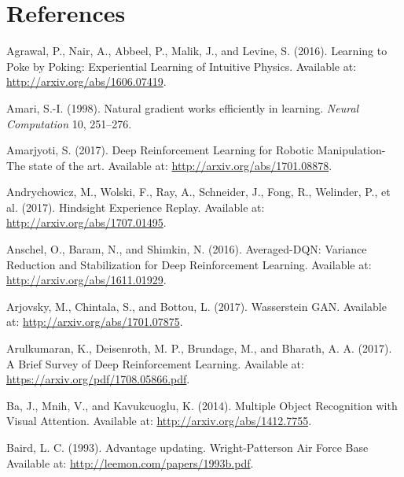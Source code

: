 \documentclass[
  letterpaper,
  DIV=11,
  numbers=noendperiod]{scrreprt}
\newlength{\cslhangindent}
\newlength{\cslentryspacingunit} %
\newenvironment{CSLReferences}[2] %
 {%
  \setlength{\parindent}{0pt}
  \ifodd #1
  \let\oldpar\par
  \def\par{\hangindent=\cslhangindent\oldpar}
  \fi
  \setlength{\parskip}{#2\cslentryspacingunit}
 }%
 {}
\begin{document}

\hypertarget{references}{%
\chapter*{References}\label{references}}

\hypertarget{refs}{}
\begin{CSLReferences}{1}{0}
\leavevmode{}%
Agrawal, P., Nair, A., Abbeel, P., Malik, J., and Levine, S. (2016).
Learning to {Poke} by {Poking}: {Experiential Learning} of {Intuitive
Physics}. Available at: \url{http://arxiv.org/abs/1606.07419}.

\leavevmode{}%
Amari, S.-I. (1998). Natural gradient works efficiently in learning.
\emph{Neural Computation} 10, 251--276.

\leavevmode{}%
Amarjyoti, S. (2017). Deep {Reinforcement Learning} for {Robotic
Manipulation-The} state of the art. Available at:
\url{http://arxiv.org/abs/1701.08878}.

\leavevmode{}%
Andrychowicz, M., Wolski, F., Ray, A., Schneider, J., Fong, R.,
Welinder, P., et al. (2017). Hindsight {Experience Replay}. Available
at: \url{http://arxiv.org/abs/1707.01495}.

\leavevmode{}%
Anschel, O., Baram, N., and Shimkin, N. (2016). Averaged-{DQN}:
{Variance Reduction} and {Stabilization} for {Deep Reinforcement
Learning}. Available at: \url{http://arxiv.org/abs/1611.01929}.

\leavevmode{}%
Arjovsky, M., Chintala, S., and Bottou, L. (2017). Wasserstein {GAN}.
Available at: \url{http://arxiv.org/abs/1701.07875}.

\leavevmode{}%
Arulkumaran, K., Deisenroth, M. P., Brundage, M., and Bharath, A. A.
(2017). A {Brief Survey} of {Deep Reinforcement Learning}. Available at:
\url{https://arxiv.org/pdf/1708.05866.pdf}.

\leavevmode{}%
Ba, J., Mnih, V., and Kavukcuoglu, K. (2014). Multiple {Object
Recognition} with {Visual Attention}. Available at:
\url{http://arxiv.org/abs/1412.7755}.

\leavevmode{}%
Baird, L. C. (1993). Advantage updating. {Wright-Patterson Air Force
Base} Available at: \url{http://leemon.com/papers/1993b.pdf}.


\end{CSLReferences}
\end{document}
